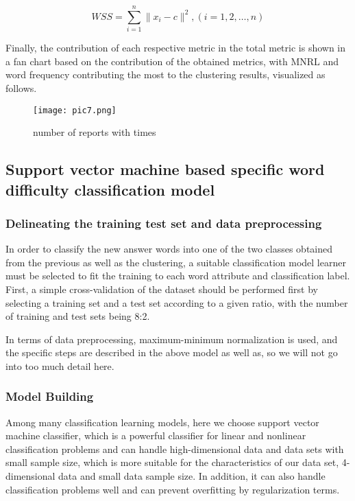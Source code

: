 \documentclass[12pt]{article}  %
\begin{document}
\begin{equation}
WSS=\sum^n_{i=1}\|x_i-c\|^2, (i=1,2, \ldots, n)
\end{equation}

Finally, the contribution of each respective metric in the total metric is shown in a fan chart based on the contribution of the obtained metrics, with MNRL and word frequency contributing the most to the clustering results, visualized as follows.
\begin{figure}[H]
	\centering
	\texttt{[image: pic7.png]}
	\caption{number of reports with times}
	\label{img19}
\end{figure}

\subsection{Support vector machine based specific word difficulty classification model} 

\subsubsection{Delineating the training test set and data preprocessing}

In order to classify the new answer words into one of the two classes obtained from the previous as well as the clustering, a suitable classification model learner must be selected to fit the training to each word attribute and classification label.
First, a simple cross-validation of the dataset should be performed first by selecting a training set and a test set according to a given ratio, with the number of training and test sets being 8:2.

In terms of data preprocessing, maximum-minimum normalization is used, and the specific steps are described in the above model as well as, so we will not go into too much detail here.

\subsubsection{Model Building}

Among many classification learning models, here we choose support vector machine classifier, which is a powerful classifier for linear and nonlinear classification problems and can handle high-dimensional data and data sets with small sample size, which is more suitable for the characteristics of our data set, 4-dimensional data and small data sample size. In addition, it can also handle classification problems well and can prevent overfitting by regularization terms.
\end{document}
